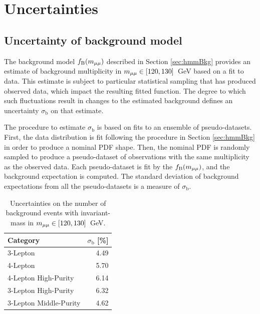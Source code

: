 \section{Uncertainties}\label{sec:hmmSyst}

\subsection{Uncertainty of background model}\label{sec:hmmBkgUncert}

The background model $f_\text{B}(m_{\mu\mu})$ described in Section \ref{sec:hmmBkg} provides an estimate of background multiplicity in $m_{\mu\mu}\in[120,130]$~GeV based on a fit to data.
This estimate is subject to particular statistical sampling that has produced observed data, which impact the resulting fitted function.
The degree to which such fluctuations result in changes to the estimated background defines an uncertainty $\sigma_\text{b}$ on that estimate.

The procedure to estimate $\sigma_\text{b}$ is based on fits to an ensemble of pseudo-datasets.
First, the data distribution is fit following the procedure in Section \ref{sec:hmmBkg} in order to produce a nominal PDF shape.
Then, the nominal PDF is randomly sampled to produce a pseudo-dataset of observations with the same multiplicity as the observed data.
Each pseudo-dataset is fit by the $f_\text{B}(m_{\mu\mu})$, and the background expectation is computed.
The standard deviation of background expectations from all the pseudo-datasets is a measure of $\sigma_\text{b}$.

\begin{table}[htp]
\caption{Uncertainties on the number of background events with invariant-mass in $m_{\mu\mu}\in[120,130]$~GeV.}
\begin{center}
\begin{tabular}{l r}
\toprule
Category & $\sigma_\text{b}$ [\%] \\
\midrule
    3-Lepton               &  4.49 \\
    4-Lepton               &  5.70 \\
\midrule
    4-Lepton High-Purity   &  6.14 \\
    3-Lepton High-Purity   &  6.32 \\
    3-Lepton Middle-Purity &  4.62 \\
\bottomrule
\end{tabular}
\label{tab:hmmSigmsB}
\end{center}
\end{table}

